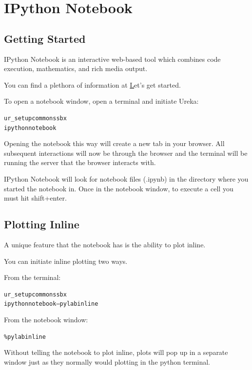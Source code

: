 \chapter{IPython Notebook}
\label{ch:notebook}

\section{Getting Started}

IPython Notebook is an interactive web-based tool which combines code execution, mathematics, and rich media output.

You can find a plethora of information at \href{http://ipython.org/ipython-doc/dev/notebook/index.html}

Let's get started.

To open a notebook window, open a terminal and initiate Ureka:

\begin{alltt}
\termtab ur_setup common ssbx
\termtab ipython notebook
\end{alltt}

Opening the notebook this way will create a new tab in your browser. All subsequent interactions will now
be through the browser and the terminal will be running the server that the browser interacts with.

IPython Notebook will look for notebook files (.ipynb) in the directory where you started the notebook in.
Once in the notebook window, to execute a cell you must hit shift+enter.

\section{Plotting Inline}

A unique feature that the notebook has is the ability to plot inline.

You can initiate inline plotting two ways.

From the terminal:
\begin{alltt}
\termtab ur_setup common ssbx
\termtab ipython notebook --pylab inline
\end{alltt}

From the notebook window:
\begin{alltt}
\pytab \%pylab inline
\end{alltt}

Without telling the notebook to plot inline, plots will pop up in a separate window just as they normally
would plotting in the python terminal.

